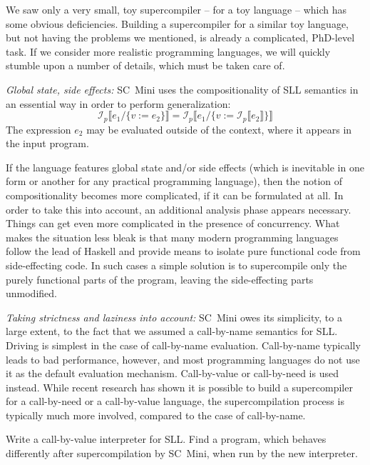 We saw only a very small, toy supercompiler -- for a toy language -- which
has some obvious deficiencies.
Building a supercompiler for a similar toy language, but not having the
problems we mentioned, is already a complicated, PhD-level task.
If we consider more realistic programming languages,
we will quickly stumble upon a number of details, which must be taken care of.


\emph{Global state, side effects:} SC~Mini uses the compositionality of SLL semantics
in an essential way in order to perform generalization:
\[\mathcal{I}_p\llbracket e_1 / \{v := e_2\}\rrbracket = \mathcal{I}_p \llbracket e_1 / \{v := \mathcal{I}_p\llbracket e_2\rrbracket\} \rrbracket\]
The expression $e_2$ may be evaluated outside of the context, where it appears in
the input program.

If the language features global state and/or side effects (which is inevitable
in one form or another for any practical programming language),
then the notion of compositionality becomes more complicated, if it can be formulated at all.
In order to take this into account, an additional analysis phase appears necessary.
Things can get even more complicated in the presence of concurrency.
What makes the situation less bleak is that many modern programming languages
follow the lead of Haskell and provide means to isolate pure functional code
from side-effecting code. In such cases a simple solution is to supercompile only the 
purely functional parts of the program, leaving the side-effecting parts unmodified.

\emph{Taking strictness and laziness into account:} SC~Mini owes its simplicity,
to a large extent, to the fact that we assumed a call-by-name semantics for SLL.
Driving is simplest in the case of call-by-name evaluation.
Call-by-name typically leads to bad performance, however, and
most programming languages do not use it as the default evaluation mechanism.
Call-by-value or call-by-need is used instead.
While recent research has shown it is possible to build a 
supercompiler for a call-by-need \cite{Mitchell2008taa,Mitchell2010Rethinking,Bolingbroke2010Eval} 
or a call-by-value \cite{Jonsson2008Supercompilation,Jonsson2011Phd} language,
the supercompilation process is typically much more involved,
compared to the case of call-by-name.

\begin{exercise}
Write a call-by-value interpreter for SLL. Find a program, which behaves differently
after supercompilation by SC~Mini, when run by the new interpreter.
\end{exercise}

